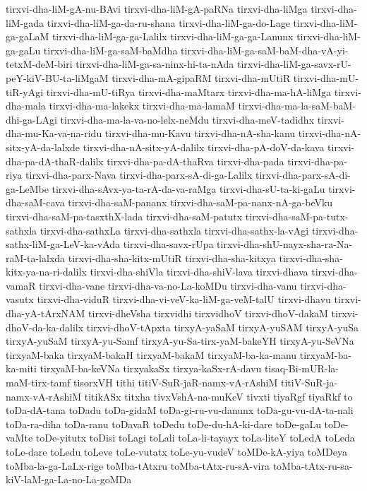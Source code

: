 {tirxvi-dha-liM-gA-nu-BAvi
tirxvi-dha-liM-gA-paRNa
tirxvi-dha-liMga
tirxvi-dha-liM-gada
tirxvi-dha-liM-ga-da-ru-shana
tirxvi-dha-liM-ga-do-Lage
tirxvi-dha-liM-ga-gaLaM
tirxvi-dha-liM-ga-ga-Lalilx
tirxvi-dha-liM-ga-ga-Lanunx
tirxvi-dha-liM-ga-gaLu
tirxvi-dha-liM-ga-saM-baMdha
tirxvi-dha-liM-ga-saM-baM-dha-vA-yi-tetxM-deM-biri
tirxvi-dha-liM-ga-sa-ninx-hi-ta-nAda
tirxvi-dha-liM-ga-savx-rU-peY-kiV-BU-ta-liMgaM
tirxvi-dha-mA-gipaRM
tirxvi-dha-mUtiR
tirxvi-dha-mU-tiR-yAgi
tirxvi-dha-mU-tiRya
tirxvi-dha-maMtarx
tirxvi-dha-ma-hA-liMga
tirxvi-dha-mala
tirxvi-dha-ma-lakekx
tirxvi-dha-ma-lamaM
tirxvi-dha-ma-la-saM-baM-dhi-ga-LAgi
tirxvi-dha-ma-la-va-no-lelx-neMdu
tirxvi-dha-meV-tadidhx
tirxvi-dha-mu-Ka-va-na-ridu
tirxvi-dha-mu-Kavu
tirxvi-dha-nA-sha-kanu
tirxvi-dha-nA-sitx-yA-da-lalxde
tirxvi-dha-nA-sitx-yA-dalilx
tirxvi-dha-pA-doV-da-kava
tirxvi-dha-pa-dA-thaR-dalilx
tirxvi-dha-pa-dA-thaRva
tirxvi-dha-pada
tirxvi-dha-pa-riya
tirxvi-dha-parx-Nava
tirxvi-dha-parx-sA-di-ga-Lalilx
tirxvi-dha-parx-sA-di-ga-LeMbe
tirxvi-dha-sAvx-ya-ta-rA-da-va-raMga
tirxvi-dha-sU-ta-ki-gaLu
tirxvi-dha-saM-cava
tirxvi-dha-saM-pananx
tirxvi-dha-saM-pa-nanx-nA-ga-beVku
tirxvi-dha-saM-pa-tasxthX-lada
tirxvi-dha-saM-patutx
tirxvi-dha-saM-pa-tutx-sathxla
tirxvi-dha-sathxLa
tirxvi-dha-sathxla
tirxvi-dha-sathx-la-vAgi
tirxvi-dha-sathx-liM-ga-LeV-ka-vAda
tirxvi-dha-savx-rUpa
tirxvi-dha-shU-nayx-sha-ra-Na-raM-ta-lalxda
tirxvi-dha-sha-kitx-mUtiR
tirxvi-dha-sha-kitxya
tirxvi-dha-sha-kitx-ya-na-ri-dalilx
tirxvi-dha-shiVla
tirxvi-dha-shiV-lava
tirxvi-dhava
tirxvi-dha-vamaR
tirxvi-dha-vane
tirxvi-dha-va-no-La-koMDu
tirxvi-dha-vanu
tirxvi-dha-vasutx
tirxvi-dha-viduR
tirxvi-dha-vi-veV-ka-liM-ga-veM-talU
tirxvi-dhavu
tirxvi-dha-yA-tArxNAM
tirxvi-dheVsha
tirxvidhi
tirxvidhoV
tirxvi-dhoV-dakaM
tirxvi-dhoV-da-ka-dalilx
tirxvi-dhoV-tApxta
tirxyA-yaSaM
tirxyA-yuSAM
tirxyA-yuSa
tirxyA-yuSaM
tirxyA-yu-Samf
tirxyA-yu-Sa-tirx-yaM-bakeYH
tirxyA-yu-SeVNa
tirxyaM-baka
tirxyaM-bakaH
tirxyaM-bakaM
tirxyaM-ba-ka-manu
tirxyaM-ba-ka-miti
tirxyaM-ba-keVNa
tirxyakaSx
tirxya-kaSx-rA-davu
tisaq-Bi-mUR-la-maM-tirx-tamf
tisorxVH
tithi
titiV-SuR-jaR-namx-vA-rAshiM
titiV-SuR-ja-namx-vA-rAshiM
titikASx
titxha
tivxVshA-na-muKeV
tivxti
tiyaRgf
tiyaRkf
to
toDa-dA-tana
toDadu
toDa-gidaM
toDa-gi-ru-vu-danunx
toDa-gu-vu-dA-ta-nali
toDa-ra-diha
toDa-ranu
toDavaR
toDedu
toDe-du-hA-ki-dare
toDe-gaLu
toDe-vaMte
toDe-yitutx
toDisi
toLagi
toLali
toLa-li-tayayx
toLa-liteY
toLedA
toLeda
toLe-dare
toLedu
toLeve
toLe-vutatx
toLe-yu-vudeV
toMDe-kA-yiya
toMDeya
toMba-la-ga-LaLx-rige
toMba-tAtxru
toMba-tAtx-ru-sA-vira
toMba-tAtx-ru-sa-kiV-laM-ga-La-no-La-goMDa
}
